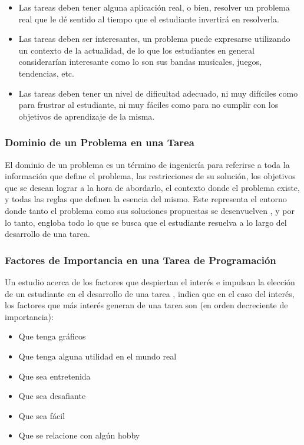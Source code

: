 \documentclass[letterpaper,12pt]{article}
\begin{document}
\begin{itemize}
  \item Las tareas deben tener alguna aplicación real, o bien, resolver un problema real que le dé sentido al tiempo que el estudiante invertirá en resolverla.
  \item Las tareas deben ser interesantes, un problema puede expresarse utilizando un contexto de la actualidad, de lo que los estudiantes en general considerarían interesante como lo son sus bandas musicales, juegos, tendencias, etc.
  \item Las tareas deben tener un nivel de dificultad adecuado, ni muy difíciles como para frustrar al estudiante, ni muy fáciles como para no cumplir con los objetivos de aprendizaje de la misma.
\end{itemize}

\subsubsection{Dominio de un Problema en una Tarea}

El dominio de un problema es un término de ingeniería para referirse a toda la información que define el problema, las restricciones de su solución, los objetivos que se desean lograr a la hora de abordarlo, el contexto donde el problema existe, y todas las reglas que definen la esencia del mismo. Este representa el entorno donde tanto el problema como sus soluciones propuestas se desenvuelven \cite{ProblemDomain}, y por lo tanto, engloba todo lo que se busca que el estudiante resuelva a lo largo del desarrollo de una tarea.

\subsubsection{Factores de Importancia en una Tarea de Programación}

Un estudio acerca de los factores que despiertan el interés e impulsan la elección de un estudiante en el desarrollo de una tarea \cite{10.5555/1968521.1968545}, indica que en el caso del interés, los factores que más interés generan de una tarea son (en orden decreciente de importancia):

\begin{itemize}
  \item Que tenga gráficos
  \item Que tenga alguna utilidad en el mundo real
  \item Que sea entretenida
  \item Que sea desafiante
  \item Que sea fácil
  \item Que se relacione con algún hobby
\end{itemize}
\end{document}
